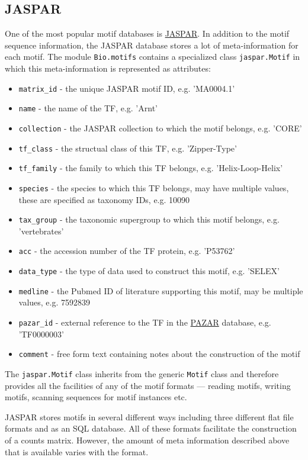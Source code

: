 \subsection{JASPAR}
One of the most popular motif databases is \href{http://jaspar.genereg.net}{JASPAR}. In addition to the motif sequence information, the JASPAR database stores a lot of meta-information for each motif. The module \verb+Bio.motifs+ contains a specialized class \verb+jaspar.Motif+ in which this meta-information is represented as attributes:
\begin{itemize}
    \item \verb+matrix_id+ - the unique JASPAR motif ID, e.g. 'MA0004.1'
    \item \verb+name+ - the name of the TF, e.g. 'Arnt'
    \item \verb+collection+ - the JASPAR collection to which the motif belongs, e.g. 'CORE'
    \item \verb+tf_class+ - the structual class of this TF, e.g. 'Zipper-Type'
    \item \verb+tf_family+ - the family to which this TF belongs, e.g. 'Helix-Loop-Helix'
    \item \verb+species+ - the species to which this TF belongs, may have multiple values, these are specified as taxonomy IDs, e.g. 10090
    \item \verb+tax_group+ - the taxonomic supergroup to which this motif belongs, e.g. 'vertebrates'
    \item \verb+acc+ - the accession number of the TF protein, e.g. 'P53762'
    \item \verb+data_type+ - the type of data used to construct this motif, e.g. 'SELEX'
    \item \verb+medline+ - the Pubmed ID of literature supporting this motif, may be multiple values, e.g. 7592839
    \item \verb+pazar_id+ - external reference to the TF in the \href{http://pazar.info}{PAZAR} database, e.g. 'TF0000003'
    \item \verb+comment+ - free form text containing notes about the construction of the motif
\end{itemize}

The \verb+jaspar.Motif+ class inherits from the generic \verb+Motif+ class and therefore provides all the facilities of any of the motif formats --- reading motifs, writing motifs, scanning sequences for motif instances etc.

JASPAR stores motifs in several different ways including three different flat file formats and as an SQL database. All of these formats facilitate the construction of a counts matrix. However, the amount of meta information described above that is available varies with the format.

